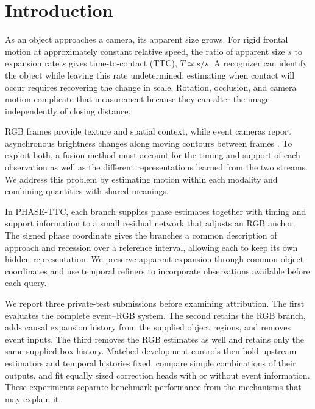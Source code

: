 \section{Introduction}
As an object approaches a camera, its apparent size grows. For rigid frontal motion at approximately constant relative speed, the ratio of apparent size $s$ to expansion rate $\dot s$ gives time-to-contact (TTC), $T\simeq s/\dot s$. A recognizer can identify the object while leaving this rate undetermined; estimating when contact will occur requires recovering the change in scale. Rotation, occlusion, and camera motion complicate that measurement because they can alter the image independently of closing distance.

RGB frames provide texture and spatial context, while event cameras report asynchronous brightness changes along moving contours between frames \citep{eventsurvey}. To exploit both, a fusion method must account for the timing and support of each observation as well as the different representations learned from the two streams. We address this problem by estimating motion within each modality and combining quantities with shared meanings.

In PHASE-TTC, each branch supplies phase estimates together with timing and support information to a small residual network that adjusts an RGB anchor. The signed phase coordinate gives the branches a common description of approach and recession over a reference interval, allowing each to keep its own hidden representation. We preserve apparent expansion through common object coordinates and use temporal refiners to incorporate observations available before each query.

We report three private-test submissions before examining attribution. The first evaluates the complete event--RGB system. The second retains the RGB branch, adds causal expansion history from the supplied object regions, and removes event inputs. The third removes the RGB estimates as well and retains only the same supplied-box history. Matched development controls then hold upstream estimators and temporal histories fixed, compare simple combinations of their outputs, and fit equally sized correction heads with or without event information. These experiments separate benchmark performance from the mechanisms that may explain it.

